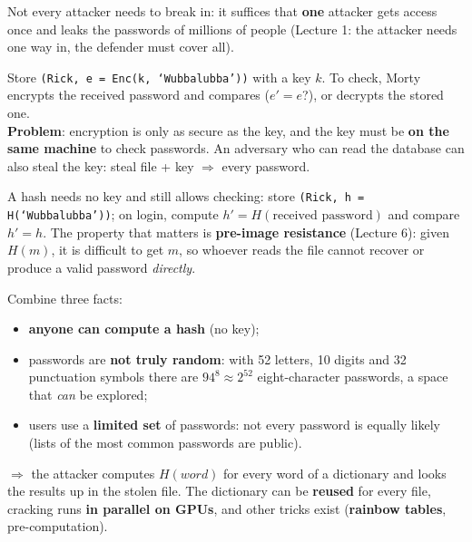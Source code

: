 \begin{warnbox}[title=Asymmetry attacker vs.\ defender]
Not every attacker needs to break in: it suffices that \textbf{one} attacker gets access once
and leaks the passwords of millions of people (Lecture 1: the attacker needs one way in, the
defender must cover all).
\end{warnbox}

\begin{defnbox}[title={Option 1: store passwords encrypted --- not enough}]
Store \texttt{(Rick, e = Enc(k, `Wubbalubba'))} with a key $k$. To check, Morty encrypts the
received password and compares ($e' = e$?), or decrypts the stored one. \\
\textbf{Problem}: encryption is only as secure as the key, and the key must be \textbf{on the same
machine} to check passwords. An adversary who can read the database can also steal the key: steal
file + key $\Rightarrow$ every password.
\end{defnbox}

\begin{defnbox}[title={Option 2: store a hash of the password --- still not enough}]
A hash needs no key and still allows checking: store \texttt{(Rick, h = H(`Wubbalubba'))}; on
login, compute $h' = H(\text{received password})$ and compare $h' = h$. The property that matters
is \textbf{pre-image resistance} (Lecture 6): given $H(m)$, it is difficult to get $m$, so whoever
reads the file cannot recover or produce a valid password \emph{directly}.
\end{defnbox}

\begin{warnbox}[title={Offline attacks: the dictionary attack}]
Combine three facts:
\begin{itemize}
  \item \textbf{anyone can compute a hash} (no key);
  \item passwords are \textbf{not truly random}: with 52 letters, 10 digits and 32 punctuation
        symbols there are $94^8 \approx 2^{52}$ eight-character passwords, a space that \emph{can}
        be explored;
  \item users use a \textbf{limited set} of passwords: not every password is equally likely
        (lists of the most common passwords are public).
\end{itemize}
$\Rightarrow$ the attacker computes $H(\textit{word})$ for every word of a dictionary and looks the
results up in the stolen file. The dictionary can be \textbf{reused} for every file, cracking runs
\textbf{in parallel on GPUs}, and other tricks exist (\textbf{rainbow tables}, pre-computation).
\end{warnbox}

